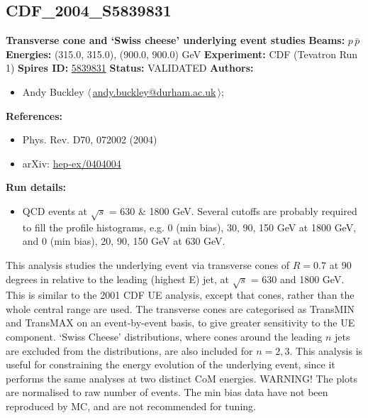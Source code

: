 \clearpage


\clearpage

\subsection[CDF\_2004\_S5839831]{CDF\_2004\_S5839831\,\cite{Acosta:2004wqa}}
\textbf{Transverse cone and `Swiss cheese' underlying event studies}\newline
\textbf{Beams:} $p$\,$\bar{p}$ \newline
\textbf{Energies:} (315.0, 315.0), (900.0, 900.0) GeV \newline
\textbf{Experiment:} CDF (Tevatron Run 1) \newline
\textbf{Spires ID:} \href{http://www.slac.stanford.edu/spires/find/hep/www?rawcmd=key+5839831}{5839831}\newline
\textbf{Status:} VALIDATED\newline
\textbf{Authors:}
\begin{itemize}
  \item Andy Buckley $\langle\,$\href{mailto:andy.buckley@durham.ac.uk}{andy.buckley@durham.ac.uk}$\,\rangle$;
\end{itemize}
\textbf{References:}
\begin{itemize}
  \item Phys. Rev. D70, 072002 (2004)
  \item arXiv: \href{http://arxiv.org/abs/hep-ex/0404004}{hep-ex/0404004}
\end{itemize}
\textbf{Run details:}
\begin{itemize}

  \item QCD events at \ensuremath{\sqrt{s}} = 630 \& 1800 GeV. Several \pTmin cutoffs are probably required to fill the profile histograms, e.g. 0 (min bias), 30, 90, 150 GeV at 1800 GeV, and 0 (min bias), 20, 90, 150 GeV at 630 GeV.\end{itemize}

\noindent This analysis studies the underlying event via transverse cones of  $R = 0.7$ at 90 degrees in \phi relative to the leading (highest E) jet, at \ensuremath{\sqrt{s}} = 630 and 1800 GeV. This is similar to the 2001 CDF UE analysis, except that cones, rather than the whole central \eta range are used. The transverse cones are categorised as TransMIN and TransMAX on an event-by-event basis, to give greater sensitivity to the UE component.
`Swiss Cheese' distributions, where cones around the leading $n$ jets are excluded from the distributions, are also included for $n = 2, 3$.  This analysis is useful for constraining the energy evolution of the underlying event, since it performs the same analyses at two distinct CoM energies.
WARNING! The \pT plots are normalised to raw number of events. The min bias data have not been reproduced by MC, and are not recommended for tuning.

